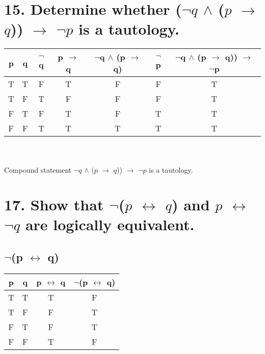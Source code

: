 \documentclass[11pt, oneside]{article} %
\numberwithin{equation}{section} %
\numberwithin{figure}{section} %
\begin{document}
\begin{table}[!htp]
\section{15. Determine whether ($\neg$$q$ $\wedge$ ($p$ $\rightarrow$ $q$)) $\rightarrow$ $\neg$$p$ is a tautology.}
\begin{tabular}{c c c c c c c}
\hline\hline
p & q & $\neg$q & p $\rightarrow$ q & $\neg$q $\wedge$ (p $\rightarrow$ q) & $\neg$p & $\neg$q $\wedge$ (p $\rightarrow$ q)) $\rightarrow$ $\neg$p\\ [0.5ex] %
\hline
T & T & F & T & F & F & T\\
T & F & T & F & F & F & T\\
F & T & F & T & F & T & T\\
F & F & T & T & T & T & T\\ [1ex]
\hline
\end{tabular}
\\\\
Compound statement $\neg$$q$ $\wedge$ $(p$ $\rightarrow$ $q$)) $\rightarrow$ $\neg$$p$ is a tautology. \\
\label{table:nonlin}
\end{table}



\begin{table}[!htp]
\section{17. Show that $\neg$($p$ $\leftrightarrow$ $q$) and $p$ $\leftrightarrow$ $\neg$$q$ are logically equivalent.}
\subsection{$\neg$(p $\leftrightarrow$ q)}
\begin{tabular}{c c c c}
\hline\hline
p & q & p $\leftrightarrow$ q & $\neg$(p $\leftrightarrow$ q) \\ [0.5ex] %
\hline
T & T & T & F\\
T & F & F & T\\
F & T & F & T\\
F & F & T & F\\ [1ex]
\hline
\end{tabular}
\label{table:nonlin}
\end{table}
\end{document}
